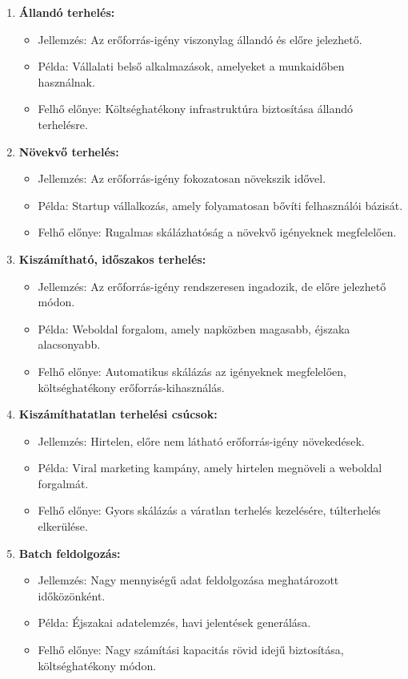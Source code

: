 \documentclass[a4paper,12pt]{article}
\begin{document}
    \begin{enumerate}
        \item \textbf{Állandó terhelés:}
        \begin{itemize}
            \item Jellemzés: Az erőforrás-igény viszonylag állandó és előre jelezhető.
            \item Példa: Vállalati belső alkalmazások, amelyeket a munkaidőben használnak.
            \item Felhő előnye: Költséghatékony infrastruktúra biztosítása állandó terhelésre.
        \end{itemize}

        \item \textbf{Növekvő terhelés:}
        \begin{itemize}
            \item Jellemzés: Az erőforrás-igény fokozatosan növekszik idővel.
            \item Példa: Startup vállalkozás, amely folyamatosan bővíti felhasználói bázisát.
            \item Felhő előnye: Rugalmas skálázhatóság a növekvő igényeknek megfelelően.
        \end{itemize}

        \item \textbf{Kiszámítható, időszakos terhelés:}
        \begin{itemize}
            \item Jellemzés: Az erőforrás-igény rendszeresen ingadozik, de előre jelezhető módon.
            \item Példa: Weboldal forgalom, amely napközben magasabb, éjszaka alacsonyabb.
            \item Felhő előnye: Automatikus skálázás az igényeknek megfelelően, költséghatékony erőforrás-kihasználás.
        \end{itemize}

        \item \textbf{Kiszámíthatatlan terhelési csúcsok:}
        \begin{itemize}
            \item Jellemzés: Hirtelen, előre nem látható erőforrás-igény növekedések.
            \item Példa: Viral marketing kampány, amely hirtelen megnöveli a weboldal forgalmát.
            \item Felhő előnye: Gyors skálázás a váratlan terhelés kezelésére, túlterhelés elkerülése.
        \end{itemize}

        \item \textbf{Batch feldolgozás:}
        \begin{itemize}
            \item Jellemzés: Nagy mennyiségű adat feldolgozása meghatározott időközönként.
            \item Példa: Éjszakai adatelemzés, havi jelentések generálása.
            \item Felhő előnye: Nagy számítási kapacitás rövid idejű biztosítása, költséghatékony módon.
        \end{itemize}
    \end{enumerate}
\end{document}
